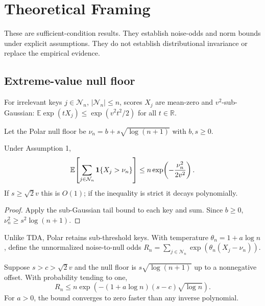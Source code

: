 \section{Theoretical Framing}
\label{appendix:theory}

These are sufficient-condition results. They establish noise-odds and norm bounds under explicit assumptions. They do not establish distributional invariance or replace the empirical evidence.

\subsection{Extreme-value null floor}

\begin{assumption}
For irrelevant keys $j\in\mathcal N_n$, $|\mathcal N_n|\leq n$, scores $X_j$ are mean-zero and $v^2$-sub-Gaussian: $\mathbb E\exp(tX_j)\leq\exp(v^2t^2/2)$ for all $t\in\mathbb R$.
\end{assumption}

Let the Polar null floor be $\nu_n=b+s\sqrt{\log(n+1)}$ with $b,s\geq0$.

\begin{proposition}
Under Assumption 1,
\begin{equation}
\mathbb E\!\left[\sum_{j\in\mathcal N_n}{\bf1}\{X_j>\nu_n\}\right]
\leq n\exp\!\left(-\frac{\nu_n^2}{2v^2}\right).
\end{equation}
If $s\geq\sqrt2v$ this is $O(1)$; if the inequality is strict it decays polynomially.
\end{proposition}

\begin{proof}
Apply the sub-Gaussian tail bound to each key and sum. Since $b\geq0$, $\nu_n^2\geq s^2\log(n+1)$.
\end{proof}

Unlike TDA, Polar retains sub-threshold keys. With temperature $\theta_n=1+a\log n$, define the unnormalized noise-to-null odds $R_n=\sum_{j\in\mathcal N_n}\exp(\theta_n(X_j-\nu_n))$.

\begin{proposition}
Suppose $s>c>\sqrt2v$ and the null floor is $s\sqrt{\log(n+1)}$ up to a nonnegative offset. With probability tending to one,
\begin{equation}
R_n\leq n\exp\!\left(-(1+a\log n)(s-c)\sqrt{\log n}\right).
\end{equation}
For $a>0$, the bound converges to zero faster than any inverse polynomial.
\end{proposition}

